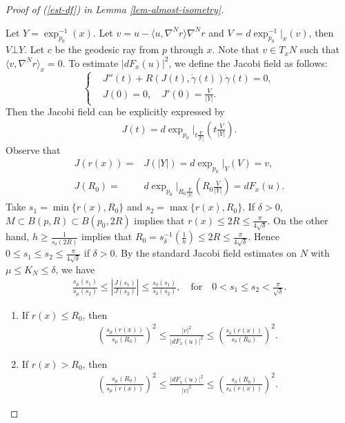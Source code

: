 \documentclass{amsart}
\numberwithin{equation}{section}
\theoremstyle{remark}
\renewcommand{\(}{\left(}
\renewcommand{\)}{\right)}
\renewcommand{\~}{\tilde}
\renewcommand{\-}{\overline}
\newcommand{\g}{\gamma}
\renewcommand{\d}{\delta}
\begin{document}
\vspace{2mm}
\begin{proof}[Proof of (\ref{est-df}) in Lemma \ref{lem-almost-isometry}]
	~
	
	Let $Y=\exp_{p_0}^{-1}(x)$. Let $v=u-\langle u,\nabla^N r\rangle \nabla^N r$ and $V=d\exp_{p_0}^{-1}|_x(v)$, then $V\bot Y$. Let $c$ be the geodesic ray from $p$ through $x$. Note that $v\in T_x N$ such that $\langle v,\nabla^N r\rangle_x=0$. To estimate $|dF_x(u)|^2$, we define the Jacobi field as follows:
	$$\left\{
	\begin{aligned}
	&J''(t)+R(J(t),\dot{\g}(t))\dot{\g}(t)=0, \\
	&J(0)=0, \quad J'(0)=\frac{V}{|Y|}.
	\end{aligned}
	\right.
	$$
	Then the Jacobi field can be explicitly expressed by
	\begin{align*}
	J(t)=d\exp_{p_0}|_{t\frac{Y}{|Y|}}\(t\frac{V}{|Y|}\).
	\end{align*}
	Observe that
	\begin{align*}
	J(r(x))= &J(|Y|)=d\exp_{p_0}|_{Y}\(V\)=v,\\
	J(R_0)= &d\exp_{p_0}|_{R_0\frac{Y}{|Y|}}\(R_0\frac{V}{|Y|}\)=dF_x(u).
	\end{align*}
	Take $s_1=\min\{r(x),R_0\}$ and $s_2=\max\{r(x),R_0\}$. If $\d>0$, $M \subset B(p,R)\subset B(p_0,2R)$ implies that $r(x)\leq 2R\leq \frac{\pi}{4\sqrt{\d}}$. On the other hand, $h \geq \frac{1}{ s_\d(2R)}$ implies that $R_0= s_\d^{-1}(\frac{1}{h}) \leq 2R \leq \frac{\pi}{4\sqrt{\d}}$. Hence $0\leq s_1\leq s_2 \leq \frac{\pi}{4\sqrt{\d}}$ if $\d>0$. By the standard Jacobi field estimates on $N$ with $\mu \leq K_N \leq \d$, we have
	\begin{align*}
	\frac{ s_\mu(s_1)}{ s_\mu(s_2)}\leq \left|\frac{J(s_1)}{J(s_2)}\right| \leq \frac{s_\d(s_1)}{s_\d(s_2)},\quad \text{for} \quad 0< s_1 \leq s_2<\frac{\pi}{\sqrt{\d}}.
	\end{align*}
	\begin{enumerate}[(1)]
		\item If $r(x)\leq R_0$, then
		\begin{align*}
		\(\frac{ s_\mu(r(x))}{ s_\mu(R_0)} \)^2\leq \frac{|v|^2}{|dF_x(u)|^2} \leq \(\frac{s_\d(r(x))}{s_\d(R_0)}\)^2.
		\end{align*}
		\item If $r(x)> R_0$, then
		\begin{align*}
		\(\frac{ s_\mu(R_0)}{ s_\mu(r(x))} \)^2\leq \frac{|dF_x(u)|^2}{|v|^2} \leq \(\frac{s_\d(R_0)}{s_\d(r(x))}\)^2.
		\end{align*}

\end{enumerate}
\end{proof}
\end{document}
